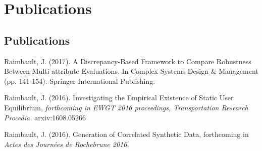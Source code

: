 

\chapter*{Publications} %






\section*{Publications}


\noindent Raimbault, J. (2017). A Discrepancy-Based Framework to Compare Robustness Between Multi-attribute Evaluations. In Complex Systems Design \& Management (pp. 141-154). Springer International Publishing.

\bigskip

\noindent Raimbault, J. (2016). Investigating the Empirical Existence of Static User Equilibrium, \textit{forthcoming in EWGT 2016 proceedings, Transportation Research Procedia.} arxiv:1608.05266


\bigskip


\noindent Raimbault, J. (2016). Generation of Correlated Synthetic Data, forthcoming in \textit{Actes des Journ{\'e}es de Rochebrune 2016.}


